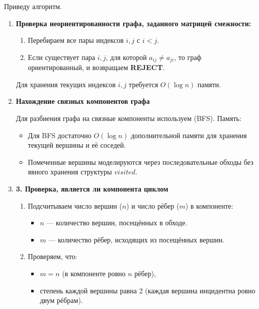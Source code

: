 \begin{solution}
    Приведу алгоритм.
    \begin{enumerate}
        \item  \textbf{Проверка неориентированности графа, заданного матрицей смежности:}

              \begin{enumerate}
                  \item Перебираем все пары индексов $i, j$ с $i < j$.
                  \item Если существует пара $i, j$, для которой $a_{ij} \neq a_{ji}$, то граф ориентированный, и возвращаем \textbf{REJECT}.
              \end{enumerate}
              Для хранения текущих индексов $i, j$ требуется $O(\log n)$ памяти.

        \item \textbf{Нахождение связных компонентов графа}

              Для разбиения графа на связные компоненты используем (BFS).
              Память:
              \begin{itemize}
                  \item Для BFS достаточно $O(\log n)$ дополнительной памяти для хранения текущей вершины и её соседей.
                  \item Помеченные вершины моделируются через последовательные обходы без явного хранения структуры $visited$.
              \end{itemize}

        \item \textbf{3. Проверка, является ли компонента циклом}
              \begin{enumerate}
                  \item Подсчитываем число вершин ($n$) и число рёбер ($m$) в компоненте:
                        \begin{itemize}
                            \item $n$ — количество вершин, посещённых в обходе.
                            \item $m$ — количество рёбер, исходящих из посещённых вершин.
                        \end{itemize}
                  \item Проверяем, что:
                        \begin{itemize}
                            \item $m = n$ (в компоненте ровно $n$ рёбер),
                            \item степень каждой вершины равна 2 (каждая вершина инцидентна ровно двум рёбрам).
                        \end{itemize}
              \end{enumerate}


\end{enumerate}
\end{solution}
